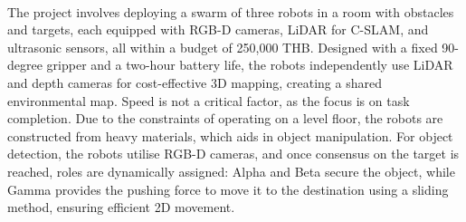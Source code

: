 \paragraph*{}
The project involves deploying a swarm of three robots in a room with obstacles and targets, each equipped with RGB-D cameras, LiDAR for C-SLAM, and ultrasonic sensors, all within a budget of 250,000 THB. Designed with a fixed 90-degree gripper and a two-hour battery life, the robots independently use LiDAR and depth cameras for cost-effective 3D mapping, creating a shared environmental map. Speed is not a critical factor, as the focus is on task completion. Due to the constraints of operating on a level floor, the robots are constructed from heavy materials, which aids in object manipulation. For object detection, the robots utilise RGB-D cameras, and once consensus on the target is reached, roles are dynamically assigned: Alpha and Beta secure the object, while Gamma provides the pushing force to move it to the destination using a sliding method, ensuring efficient 2D movement.
